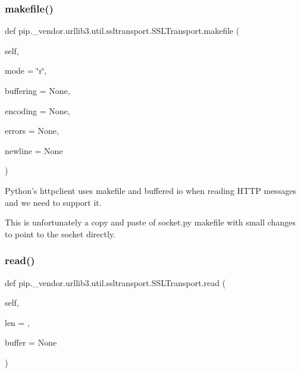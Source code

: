 \subsubsection{\texorpdfstring{makefile()}{makefile()}}
{\footnotesize\ttfamily def pip.\+\_\+vendor.\+urllib3.\+util.\+ssltransport.\+S\+S\+L\+Transport.\+makefile (\begin{DoxyParamCaption}\item[{}]{self,  }\item[{}]{mode = {\ttfamily \char`\"{}r\char`\"{}},  }\item[{}]{buffering = {\ttfamily None},  }\item[{}]{encoding = {\ttfamily None},  }\item[{}]{errors = {\ttfamily None},  }\item[{}]{newline = {\ttfamily None} }\end{DoxyParamCaption})}

\begin{DoxyVerb}Python's httpclient uses makefile and buffered io when reading HTTP
messages and we need to support it.

This is unfortunately a copy and paste of socket.py makefile with small
changes to point to the socket directly.
\end{DoxyVerb}
 \mbox{\label{classpip_1_1__vendor_1_1urllib3_1_1util_1_1ssltransport_1_1SSLTransport_ae42fe1ea6f153f83b9ceb515fa2f1f85}} 
\subsubsection{\texorpdfstring{read()}{read()}}
{\footnotesize\ttfamily def pip.\+\_\+vendor.\+urllib3.\+util.\+ssltransport.\+S\+S\+L\+Transport.\+read (\begin{DoxyParamCaption}\item[{}]{self,  }\item[{}]{len = {},  }\item[{}]{buffer = {\ttfamily None} }\end{DoxyParamCaption})}

